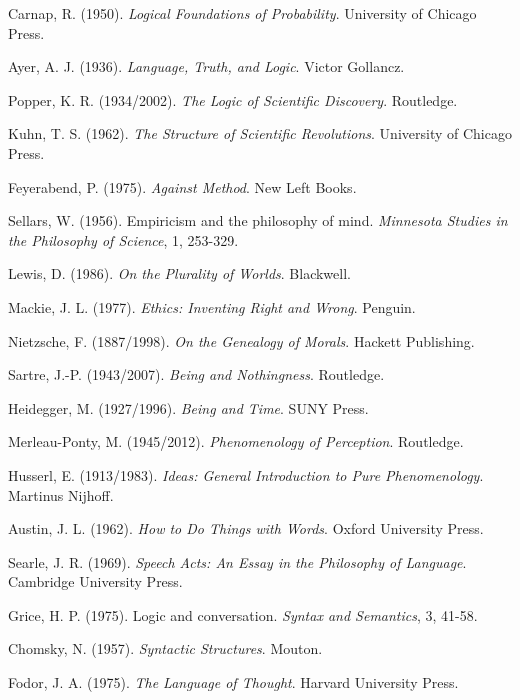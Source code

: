 \documentclass[12pt,a4paper]{article}
\begin{document}
\begin{thebibliography}{99}
Carnap, R. (1950). \textit{Logical Foundations of Probability}. University of Chicago Press.

Ayer, A. J. (1936). \textit{Language, Truth, and Logic}. Victor Gollancz.

Popper, K. R. (1934/2002). \textit{The Logic of Scientific Discovery}. Routledge.

Kuhn, T. S. (1962). \textit{The Structure of Scientific Revolutions}. University of Chicago Press.

Feyerabend, P. (1975). \textit{Against Method}. New Left Books.

Sellars, W. (1956). Empiricism and the philosophy of mind. \textit{Minnesota Studies in the Philosophy of Science}, 1, 253-329.

Lewis, D. (1986). \textit{On the Plurality of Worlds}. Blackwell.

Mackie, J. L. (1977). \textit{Ethics: Inventing Right and Wrong}. Penguin.

Nietzsche, F. (1887/1998). \textit{On the Genealogy of Morals}. Hackett Publishing.

Sartre, J.-P. (1943/2007). \textit{Being and Nothingness}. Routledge.

Heidegger, M. (1927/1996). \textit{Being and Time}. SUNY Press.

Merleau-Ponty, M. (1945/2012). \textit{Phenomenology of Perception}. Routledge.

Husserl, E. (1913/1983). \textit{Ideas: General Introduction to Pure Phenomenology}. Martinus Nijhoff.

Austin, J. L. (1962). \textit{How to Do Things with Words}. Oxford University Press.

Searle, J. R. (1969). \textit{Speech Acts: An Essay in the Philosophy of Language}. Cambridge University Press.

Grice, H. P. (1975). Logic and conversation. \textit{Syntax and Semantics}, 3, 41-58.

Chomsky, N. (1957). \textit{Syntactic Structures}. Mouton.

Fodor, J. A. (1975). \textit{The Language of Thought}. Harvard University Press.


\end{thebibliography}
\end{document}
